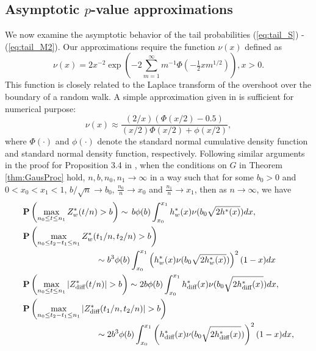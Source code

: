 \documentclass[arxiv, preprint]{imsart}
\numberwithin{equation}{section}
\theoremstyle{plain}
\begin{document}
\subsection{Asymptotic $p$-value approximations}
We now examine the asymptotic behavior of the tail probabilities (\ref{eq:tail_S}) - (\ref{eq:tail_M2}). Our approximations require the function $\nu(x)$ defined as
\begin{equation}
\label{eq:nu} \nu(x) = 2x^{-2} \exp \left ( -2 \sum_{m=1}^{\infty}m^{-1}\Phi \left( -\tfrac{1}{2}xm^{1/2} \right)\right ), x > 0.\end{equation}
This function is closely related to the Laplace transform of the overshoot over the boundary of a random walk. A simple approximation given in \cite{siegmund2007statistics} is sufficient for numerical purpose: 
\begin{equation}
\label{eq:nu_approx} \nu(x) \approx \frac{(2/x)(\Phi(x/2)-0.5)}{(x/2)\Phi(x/2)+\phi(x/2)},\end{equation}
where $\Phi(\cdot)$ and $\phi(\cdot)$ denote the standard normal cumulative density function and standard normal density function, respectively. Following similar arguments in the proof for Proposition 3.4 in \cite{chen2015graph}, when the conditions on $G$ in Theorem \ref{thm:GausProc} hold, $n,b,n_0,n_1 \rightarrow \infty$ in a way such that for some $b_0>0$ and $0<x_0<x_1<1$, $b/\sqrt{n}\rightarrow b_0$, $\tfrac{n_0}{n}\rightarrow x_0$ and $\tfrac{n_1}{n}\rightarrow x_1$, 
then as $n \rightarrow \infty$, we have 
\begin{align*}
& \boldP\left(\max_{n_0 \le t \le n_1} Z^*_w(t/n) > b\right) \sim \, b \phi(b) \int_{x_0}^{x_1} h_w^*(x) \nu (b_0 \sqrt{2h^*(x)})dx, \\
& \boldP \left(\max_{{n_0 \le t_2 -t_1 \le n_1}} Z^*_w({t_1}/{n},{t_2}/{n}) > b \right)  \\
& \hspace{30mm}   \sim b^3 \phi(b) \int_{x_0}^{x_1} \left( h_w^*(x) \nu (b_0 \sqrt{2h_w^*(x)}) \right ) ^2 (1-x)dx \nonumber \\
& \boldP \left(\max_{n_0 \le t \le n_1} |Z_\text{diff}^*(t/n)| > b \right)   \sim 2 b \phi(b) \int_{x_0}^{x_1} h^*_\text{diff}(x) \nu (b_0 \sqrt{2 h^*_\text{diff}(x)}) dx, \nonumber \\
& \boldP \left(\max_{n_0 \le t_2 -t_1 \le n_1} |Z^*_\text{diff}(t_1/n,t_2/n)| > b \right)  \\
& \hspace{30mm}   \sim 2b^3 \phi(b) \int_{x_0}^{x_1} \left( h_\text{diff}^*(x) \nu (b_0 \sqrt{2h_\text{diff}^*(x)}) \right ) ^2 (1-x)dx, \nonumber
\end{align*}
\end{document}
